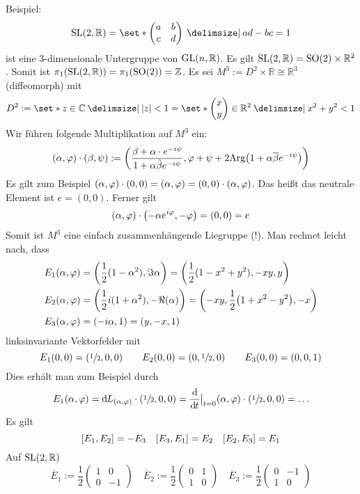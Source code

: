Beispiel: 
\[
	\SL(2,\mathbb{R}) = \set*{\begin{pmatrix}
		a & b \\ c & d
	\end{pmatrix} \given ad - bc =1}
\]
ist eine 3-dimensionale Untergruppe von $\GL(n,\mathbb{R})$.
Es gilt $\SL(2,\mathbb{R}) = \SO(2) \times \mathbb{R}^2$.
Somit ist $\pi_1 \enbrace*{\SL(2,\mathbb{R})} = \pi_1 (\SO(2)) = \mathbb{Z}$.
Es sei $M^3 := D^2 \times \mathbb{R} \cong \mathbb{R}^3$ (diffeomorph) mit
\[
	D^2 := \set*{z \in \mathbb{C} \given \abs*{z} <1} = \set*{\begin{pmatrix}
		x \\ y
	\end{pmatrix} \in \mathbb{R}^2 \given x^2 +y^2 <1}
\]
Wir führen folgende Multiplikation auf $M^3$ ein:
\[
	(\alpha,\varphi) \cdot (\beta, \psi) := \enbrace*{ \frac{\beta + \alpha \cdot e^{-i \psi}}{1 + \alpha \tilde{\beta} e^{-i \psi}}, \varphi + \psi + 2 \mathrm{Arg} \enbrace*{1 + \alpha \overline{\beta} e^{-i \psi}} }
\]
Es gilt zum Beispiel $(\alpha,\varphi) \cdot (0,0) = \enbrace*{\alpha,\varphi} = (0,0) \cdot (\alpha,\varphi)$.
Das heißt das neutrale Element ist $e=(0,0)$.
Ferner gilt
\[
	(\alpha,\varphi) \cdot \enbrace*{- \alpha e^{i \varphi}, -\varphi} = (0,0) = e
\]
Somit ist $M^3$ eine einfach zusammenhängende Liegruppe (!).
Man rechnet leicht nach, dass 
\begin{align}
	E_1(\alpha,\varphi) &= \enbrace*{\frac{1}{2}  (1- \alpha^2), \Im \alpha} = \enbrace*{\frac{1}{2} (1 -x^2 +y^2), -xy,y} \\
	E_2(\alpha,\varphi) &= \enbrace*{\frac{1}{2} i (1+ \alpha^2), - \Re(\alpha) } = \enbrace*{-xy, \frac{1}{2} \enbrace*{1+x^2 -y^2}, -x} \\
	E_3(\alpha,\varphi) &= \enbrace*{-i \alpha,1} = (y,-x,1)
\end{align}
linksinvariante Vektorfelder mit
\[
	E_1(0,0) = \enbrace*{\sfrac{1}{2},0,0 } \qquad E_2(0,0) = \enbrace*{0, \sfrac{1}{2}, 0 } \qquad E_3(0,0) = (0,0,1)
\]
Dies erhält man zum Beispiel durch
\[
	E_1(\alpha,\varphi) = \mathd L_{(\alpha,\varphi)} \cdot \enbrace*{\sfrac{1}{2},0,0} = \diffd{}{t}\big|_{t=0} (\alpha,\varphi) \cdot \enbrace*{\sfrac{1}{2},0,0} = \ldots 
\]
Es gilt
\[
	\benbrace*{E_1,E_2} = - E_3 \quad \benbrace*{E_3,E_1} = E_2 \quad \benbrace*{E_2,E_3} =E_1
\]
Auf $\SL(2,\mathbb{R})$
\[
	\overline{E}_1 := \frac{1}{2} \begin{pmatrix}
		1 & 0 \\ 0 & -1
	\end{pmatrix} \quad 
	\overline{E}_2 := \frac{1}{2}  \begin{pmatrix}
		0 & 1 \\ 1 & 0
	\end{pmatrix} \quad 
	\overline{E}_3 := \frac{1}{2} \begin{pmatrix}
		0 & -1 \\ 1 & 0
	\end{pmatrix} 
\]

